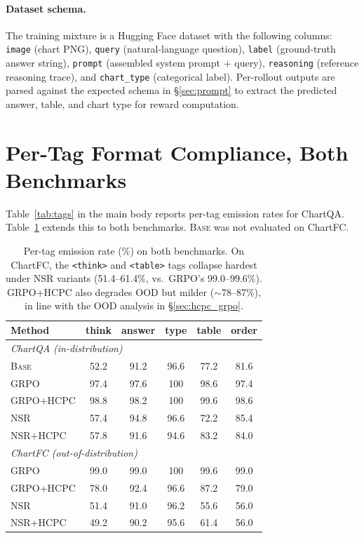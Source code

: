 \documentclass[11pt]{article}
\begin{document}
\paragraph{Dataset schema.}
The training mixture is a Hugging Face dataset with the following
columns: \texttt{image} (chart PNG), \texttt{query} (natural-language
question), \texttt{label} (ground-truth answer string),
\texttt{prompt} (assembled system prompt $+$ query),
\texttt{reasoning} (reference reasoning trace), and
\texttt{chart\_type} (categorical label). Per-rollout outputs are
parsed against the expected schema in \S\ref{sec:prompt} to extract
the predicted answer, table, and chart type for reward computation.

\section{Per-Tag Format Compliance, Both Benchmarks}
\label{sec:tags_full}

Table~\ref{tab:tags} in the main body reports per-tag emission rates
for ChartQA. Table~\ref{tab:tags_full} extends this to both
benchmarks. \textsc{Base} was not evaluated on ChartFC.

\begin{table}[!htbp]
\centering
\footnotesize
\setlength{\tabcolsep}{3.5pt}
\begin{tabular}{lccccc}
\toprule
Method & think & answer & type & table & order\\
\midrule
\multicolumn{6}{l}{\emph{ChartQA (in-distribution)}}\\
\textsc{Base}      & 52.2 & 91.2 & 96.6 & 77.2 & 81.6\\
\textsc{GRPO}      & 97.4 & 97.6 & 100  & 98.6 & 97.4\\
\textsc{GRPO+HCPC} & 98.8 & 98.2 & 100  & 99.6 & 98.6\\
\textsc{NSR}       & 57.4 & 94.8 & 96.6 & 72.2 & 85.4\\
\textsc{NSR+HCPC}  & 57.8 & 91.6 & 94.6 & 83.2 & 84.0\\
\midrule
\multicolumn{6}{l}{\emph{ChartFC (out-of-distribution)}}\\
\textsc{GRPO}      & 99.0 & 99.0 & 100  & 99.6 & 99.0\\
\textsc{GRPO+HCPC} & 78.0 & 92.4 & 96.6 & 87.2 & 79.0\\
\textsc{NSR}       & 51.4 & 91.0 & 96.2 & 55.6 & 56.0\\
\textsc{NSR+HCPC}  & 49.2 & 90.2 & 95.6 & 61.4 & 56.0\\
\bottomrule
\end{tabular}
\caption{Per-tag emission rate (\%) on both benchmarks. On ChartFC,
the \texttt{<think>} and \texttt{<table>} tags collapse hardest under
NSR variants (51.4--61.4\%, vs.\ GRPO's 99.0--99.6\%). GRPO+HCPC also
degrades OOD but milder ($\sim$78--87\%), in line with the OOD
analysis in \S\ref{sec:hcpc_grpo}.}
\label{tab:tags_full}
\end{table}
\end{document}
